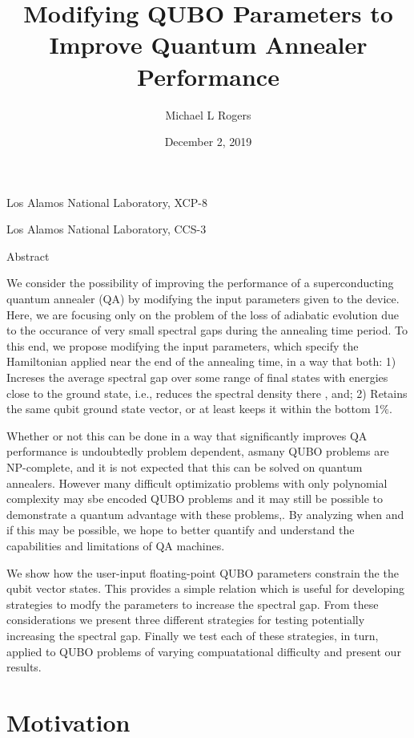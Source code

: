 \documentclass{article}
\begin{document}
\title{Modifying QUBO Parameters to Improve Quantum Annealer Performance}
\author{Michael L Rogers}
\date{December 2, 2019}
\maketitle

Los Alamos National Laboratory, XCP-8

Los Alamos National Laboratory, CCS-3

Abstract



We consider the possibility of improving the performance of a superconducting quantum annealer (QA) by modifying the input parameters given to the
device. Here, we are focusing only on the problem of the loss of adiabatic evolution due to the occurance of very small spectral gaps { }during the
annealing time period. To this end, we propose modifying the input parameters, which specify the Hamiltonian applied near the end of the annealing
time, { }in a way that both: 1) Increses the average spectral gap over some range of final states with energies close to the ground state, i.e.,
reduces the spectral density there , and; 2) Retains the same qubit ground state vector, or at least keeps it within the bottom 1$\%$. { }



Whether or not this can be done in a way that significantly improves QA performance is undoubtedly problem dependent, asmany { }QUBO problems are
NP-complete, and it is not expected that this can be solved on quantum annealers. { }However many difficult optimizatio problems with only polynomial
complexity may sbe encoded QUBO problems and it may still be possible to demonstrate a quantum advantage with these problems,. By analyzing when
and if this may be possible, we hope to better quantify and understand the capabilities and limitations of QA machines.



We show how the user-input floating-point QUBO parameters constrain the the qubit vector states. This provides a simple relation which is useful
for developing strategies to modfy the parameters to increase the spectral gap. { }From these considerations we present three different strategies
for testing potentially increasing the spectral gap. { }Finally we test each of these strategies, in turn, applied to QUBO problems of varying compuatational
difficulty and present our results.

\section*{Motivation}
\end{document}
